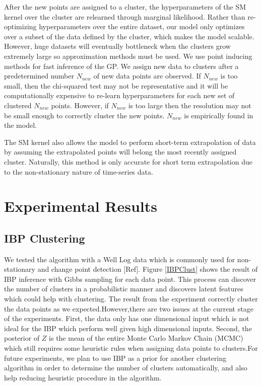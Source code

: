 \documentclass{article}
\begin{document}
After the new points are assigned to a cluster, the hyperparameters of the SM kernel over the cluster are relearned through marginal likelihood. Rather than re-optimizing hyperparameters over the entire dataset, our model only optimizes over a subset of the data defined by the cluster, which makes the model scalable. However, huge datasets will eventually bottleneck when the clusters grow extremely large so approximation methods must be used. We use point inducing methods for fast inference of the GP. We assign new data to clusters after a predetermined number $N_{new}$ of new data points are observed. If $N_{new}$ is too small, then the chi-squared test may not be representative and it will be computationally expensive to re-learn hyperparameters for each new set of clustered $N_{new}$ points. However, if $N_{new}$ is too large then the resolution may not be small enough to correctly cluster the new points. $N_{new}$ is empirically found in the model.

The SM kernel also allows the model to perform short-term extrapolation of data by assuming the extrapolated points will belong the most recently assigned cluster. Naturally, this method is only accurate for short term extrapolation due to the non-stationary nature of time-series data.

\section{Experimental Results}

\subsection{IBP Clustering}

We tested the algorithm with a Well Log data which is commonly used for non-stationary and change point detection [Ref]. Figure \ref{IBPClust} shows the result of IBP inference with Gibbs sampling for each data point. This process can discover the number of clusters in a probabilistic manner and discovers latent features which could help with clustering. The result from the experiment correctly cluster the data points as we expected.However,there are two issues at the current stage of the experiments. First, the data only has one dimensional input which is not ideal for the IBP which perform well given high dimensional inputs. Second, the posterior of $Z$ is the mean of the entire Monte Carlo Markov Chain (MCMC) which still requires some heuristic rules when assigning data points to clusters.For future experiments, we plan to use IBP as a prior for another clustering algorithm in order to determine the number of clusters automatically, and also help reducing heuristic procedure in the algorithm. 
\end{document}
